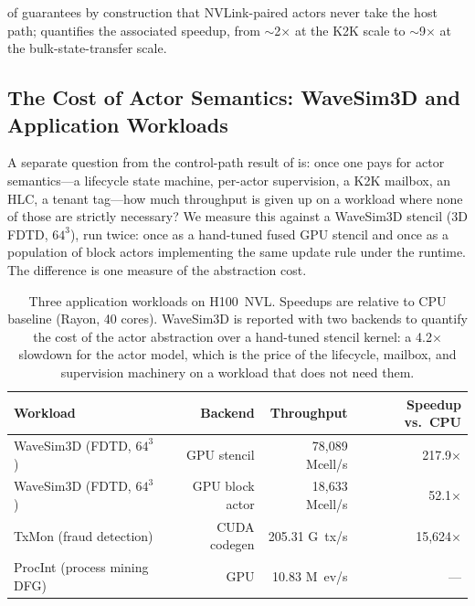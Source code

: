  of 
guarantees by construction that NVLink-paired actors never take
the host path;  quantifies the associated
speedup, from $\sim$2$\times$ at the K2K scale to $\sim$9$\times$
at the bulk-state-transfer scale.

\subsection{The Cost of Actor Semantics: WaveSim3D and Application Workloads}
\label{sec:eval:apps}

A separate question from the control-path result of
 is: once one pays for actor semantics---a
lifecycle state machine, per-actor supervision, a K2K mailbox, an
HLC, a tenant tag---how much throughput is given up on a workload
where none of those are strictly necessary?  We measure this
against a WaveSim3D stencil (3D FDTD, $64^3$), run twice: once as a
hand-tuned fused GPU stencil and once as a population of block
actors implementing the same update rule under the \system{}
runtime.  The difference is one measure of the abstraction cost.

\begin{table}[htbp]
\centering
\begin{tabular}{lrrr}
\toprule
Workload & Backend & Throughput & Speedup vs.\ CPU \\
\midrule
WaveSim3D (FDTD, $64^3$)        & GPU stencil    & 78{,}089 Mcell/s & 217.9$\times$ \\
WaveSim3D (FDTD, $64^3$)        & GPU block actor & 18{,}633 Mcell/s & 52.1$\times$ \\
TxMon (fraud detection)          & CUDA codegen   & 205.31 G~tx/s & 15{,}624$\times$ \\
ProcInt (process mining DFG)     & GPU            & 10.83 M~ev/s & --- \\
\bottomrule
\end{tabular}
\caption{Three application workloads on H100~NVL.  Speedups are
relative to CPU baseline (Rayon, 40 cores).  WaveSim3D is reported
with two backends to quantify the cost of the actor abstraction
over a hand-tuned stencil kernel: a 4.2$\times$ slowdown for the
actor model, which is the price of the lifecycle, mailbox, and
supervision machinery on a workload that does not need them.}
\label{tab:apps}
\end{table}

